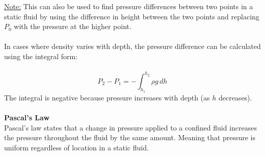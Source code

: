 \documentclass[12pt]{article}
\begin{document}
\underline{Note:} This can also be used to find pressure differences between two points in a static fluid by using the difference in height between the two points and replacing $P_0$ with the pressure at the higher point.\\\\
In cases where density varies with depth, the pressure difference can be calculated using the integral form:\\\\
\[P_2 - P_1 = -\int_{h_1}^{h_2} \rho g \, dh\]
The integral is negative because pressure increases with depth (as $h$ decreases).\\\\
\textbf{Pascal's Law}\\
Pascal's law states that a change in pressure applied to a confined fluid increases the pressure throughout the fluid by the same amount. Meaning that pressure is uniform regardless of location in a static fluid. 
\end{document}

